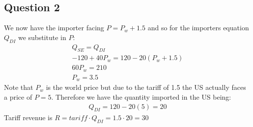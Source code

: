 \documentclass{article}
\begin{document}
\par \vspace{0.8em}
\subsection{Question 2}


We now have the importer facing $P = P_{w} + 1.5$ and so for the importers equation $Q_{DI}$ we substitute in $P$:
\begin{gather*}
  Q_{SE} = Q_{DI} \\
  -120 + 40 P_{w} = 120 - 20 (P_{w} + 1.5) \\
  60 P_{w} = 210 \\
  P_{w} = 3.5
\end{gather*}
Note that $P_{w}$ is the world price but due to the tariff of 1.5 the US actually faces a price of $P=5$. Therefore we have the quantity imported in the US being:
\begin{gather*}
  Q_{DI} = 120 - 20(5) = 20
\end{gather*}
Tariff revenue is $R = tariff \cdot Q_{DI} = 1.5 \cdot 20 = 30$
\end{document}
